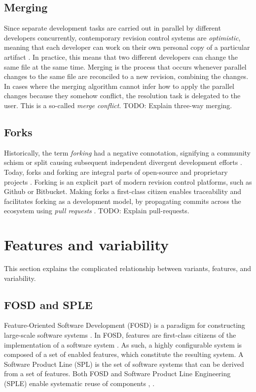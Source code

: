 \subsection{Merging}
Since separate development tasks are carried out in parallel by different developers concurrently, contemporary revision control systems are \textit{optimistic}, meaning that each developer can work on their own personal copy of a particular artifact \cite{mens2002}. In practice, this means that two different developers can change the same file at the same time. Merging is the process that occurs whenever parallel changes to the same file are reconciled to a new revision, combining the changes. In cases where the merging algorithm cannot infer how to apply the parallel changes because they somehow conflict, the resolution task is delegated to the user. This is a so-called \textit{merge conflict}. TODO: Explain three-way merging.

\subsection{Forks}
Historically, the term \textit{forking} had a negative connotation, signifying a community schism or split causing subsequent independent divergent development efforts \cite{stanciulescu2015}. Today, forks and forking are integral parts of open-source and proprietary projects \cite{stanciulescu2015}. %
Forking is an explicit part of modern revision control platforms, such as Github or Bitbucket. Making forks a first-class citizen enables traceability and facilitates forking as a development model, by propagating commits across the ecosystem using \textit{pull requests} \cite{stanciulescu2015}. TODO: Explain pull-requests.

\section{Features and variability}
This section explains the complicated relationship between variants, features, and variability.

\subsection{FOSD and SPLE}
Feature-Oriented Software Development (FOSD) is a paradigm for constructing large-scale software systems \cite{apel2009overview}. In FOSD, features are first-class citizens of the implementation of a software system \cite{apel2009overview}. As such, a highly configurable system is composed of a set of enabled features, which constitute the resulting system. A Software Product Line (SPL) is the set of software systems that can be derived from a set of features. Both FOSD and Software Product Line Engineering (SPLE) enable systematic reuse of components \cite{apel2009overview}, \cite{antkiewicz2014flexible}.

